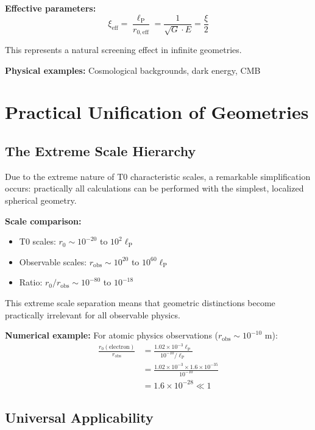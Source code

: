 \documentclass[12pt,a4paper]{report}
\newcommand{\lP}{\ell_{\text{P}}}         %
\newcommand{\rzero}{r_0}                  %
\begin{document}
\textbf{Effective parameters:}
\begin{equation}
	\xi_{\text{eff}} = \frac{\lP}{r_{0,\text{eff}}} = \frac{1}{\sqrt{G} \cdot E} = \frac{\xi}{2}
\end{equation}

This represents a natural screening effect in infinite geometries.

\textbf{Physical examples:} Cosmological backgrounds, dark energy, CMB

\section{Practical Unification of Geometries}
\label{sec:practical_unification}

\subsection{The Extreme Scale Hierarchy}
\label{subsec:extreme_scale_hierarchy}

Due to the extreme nature of T0 characteristic scales, a remarkable simplification occurs: practically all calculations can be performed with the simplest, localized spherical geometry.

\textbf{Scale comparison:}
\begin{itemize}
	\item T0 scales: $\rzero \sim 10^{-20}$ to $10^{2} \lP$
	\item Observable scales: $r_{\text{obs}} \sim 10^{20}$ to $10^{60} \lP$
	\item Ratio: $\rzero/r_{\text{obs}} \sim 10^{-80}$ to $10^{-18}$
\end{itemize}

This extreme scale separation means that geometric distinctions become practically irrelevant for all observable physics.

\textbf{Numerical example:}
For atomic physics observations ($r_{\text{obs}} \sim 10^{-10}$ m):
\begin{align}
	\frac{\rzero(\text{electron})}{r_{\text{obs}}} &= \frac{1.02 \times 10^{-3} \lP}{10^{-10}/\lP} \\
	&= \frac{1.02 \times 10^{-3} \times 1.6 \times 10^{-35}}{10^{-10}} \\
	&= 1.6 \times 10^{-28} \ll 1
\end{align}

\subsection{Universal Applicability}
\label{subsec:universal_applicability}
\end{document}
